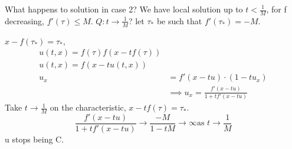 \documentclass[a4paper]{article}
\theoremstyle{definition}
\begin{document}
	What happens to solution in case 2? We have local solution up to $t<\frac{1}{M}$, for f decreasing, $f'\left( \tau \right) \le M$. $Q:t\to \frac{1}{M}$? let $\tau_*$ be such that $f'\left( \tau _*\right) =-M $. 

	$x-f\left( \tau_* \right) =\tau_*$, 
	\begin{align*}
		\label{eq:jdkf}
		u\left( t,x  \right) =f\left( \tau \right) f\left( x-tf\left( \tau \right)  \right) \\
		u\left( t,x  \right) =f\left( x-tu \left( t,x  \right)  \right) \\
		u_x &= f'\left( x-tu \right) \cdot \left( 1-tu_x \right)  \\&\implies u_x=\frac{f'\left( x-tu \right) }{1+tf'\left( x-tu \right) }
	\end{align*}
	Take $t\to \frac{1}{M }$ on the characteristic, $x-tf\left( \tau \right) =\tau_*$. 
	\begin{equation}
	\frac{f'\left( x-tu \right) }{1+tf'\left( x-tu \right) }\to \frac{-M }{1-tM} \to \infty \text{as $t\to \frac{1}{M}$}	\end{equation} 
	u stops being C. 
	
\end{document}
